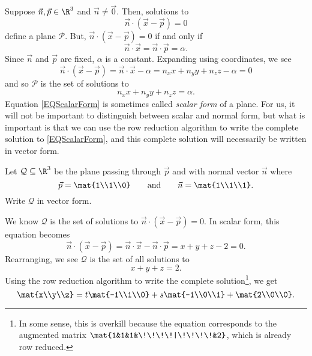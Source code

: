 Suppose $\vec n,\vec p\in \R^3$ and $\vec n\neq \vec 0$. Then, solutions to 
\[
		\vec n\cdot(\vec x-\vec p)=0
\]
define a plane $\mathcal P$. But, $\vec n\cdot (\vec x-\vec p)=0$
if and only if
\[
		\vec n\cdot\vec x = \vec n\cdot \vec p = \alpha.
\]
Since $\vec n$ and $\vec p$ are fixed, $\alpha$ is a constant. Expanding using
coordinates, we see
\[
		\vec n\cdot(\vec x-\vec p)=\vec n\cdot\vec x-\alpha=
		n_xx+n_yy+n_zz-\alpha=0
\]
and so $\mathcal P$ is the set of solutions to
\begin{equation}
	\label{EQScalarForm}
		n_xx+n_yy+n_zz=\alpha.
\end{equation}
Equation \eqref{EQScalarForm} is sometimes
called \emph{scalar form}
of a plane.  For us, it will not be important to distinguish between scalar and normal form, but
what is important is that we can use the row reduction algorithm to write the complete solution
to \eqref{EQScalarForm}, and this complete solution will necessarily be written in vector form.

\begin{example}
	Let $\mathcal Q\subseteq \R^3$ be the plane passing through $\vec p$ and with normal vector $\vec n$ where
	\[
		\vec p=\mat{1\\1\\0}\qquad\text{and}\qquad\vec n=\mat{1\\1\\1}.
	\]
	Write $\mathcal Q$ in vector form.

	We know $\mathcal Q$ is the set of solutions to $\vec n\cdot (\vec x-\vec p)=0$. In scalar form, this equation
	becomes
	\[
		\vec n\cdot (\vec x-\vec p)=\vec n\cdot \vec x-\vec n\cdot \vec p = x+y+z-2=0.
	\]
	Rearranging, we see $\mathcal Q$ is the set of all solutions to
	\[
		x+y+z=2.
	\]
	Using the row reduction algorithm to write the complete solution\footnote{ In some sense, this is overkill
	because the equation corresponds to the augmented matrix $\mat{1&1&1&\!\!\!\!|\!\!\!\!&2}$, which is already row reduced.}, we get
	\[
		\mat{x\\y\\z}=t\mat{-1\\1\\0}+s\mat{-1\\0\\1}+\mat{2\\0\\0}.
	\]
\end{example}
